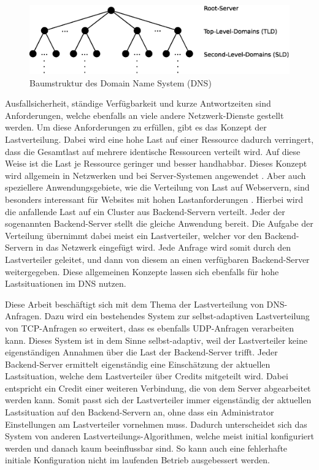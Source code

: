 \documentclass[a4paper, 12pt, BCOR10mm, DIV12, toc=bibliography, toc=listof, german]{scrbook}
\def \dns {Domain Name System (DNS)}
\begin{document}
		\begin{figure}
			\centering
			\includegraphics[width=\textwidth]{images/tree}
			\caption{Baumstruktur des \dns{}}
			\label{fig:tree}
		\end{figure}


		Ausfallsicherheit, ständige Verfügbarkeit und kurze Antwortzeiten sind Anforderungen, welche
		ebenfalls an viele andere Netzwerk-Dienste gestellt werden. Um diese Anforderungen zu erfüllen,
		gibt es das Konzept der Lastverteilung. Dabei wird eine hohe Last auf einer Ressource dadurch
		verringert, dass die Gesamtlast auf mehrere identische Ressourcen verteilt wird. Auf diese Weise
		ist die Last je Ressource geringer und besser handhabbar. Dieses Konzept wird allgemein in
		Netzwerken und bei Server-Systemen angewendet \cite{bourke2001, kopparapu2002}. Aber auch
		speziellere Anwendungsgebiete, wie die Verteilung von Last auf Webservern, sind besonders
		interessant für Websites mit hohen Lastanforderungen \cite{meplho2012}. Hierbei wird die
		anfallende Last auf ein Cluster aus Backend-Servern verteilt. Jeder der sogenannten
		Backend-Server stellt die gleiche Anwendung bereit. Die Aufgabe der Verteilung übernimmt dabei
		meist ein Lastverteiler, welcher vor den Backend-Servern in das Netzwerk eingefügt wird. Jede
		Anfrage wird somit durch den Lastverteiler geleitet, und dann von diesem an einen verfügbaren
		Backend-Server weitergegeben. Diese allgemeinen Konzepte lassen sich ebenfalls für hohe
		Lastsituationen im DNS nutzen.

		Diese Arbeit beschäftigt sich mit dem Thema der Lastverteilung von DNS-Anfragen. Dazu wird ein
		bestehendes System \cite{zinke2007,scsczile2008,zinke2012,salbnet} zur selbst-adaptiven
		Lastverteilung von TCP-Anfragen so erweitert, dass es ebenfalls UDP-Anfragen verarbeiten kann.
		Dieses System ist in dem Sinne selbst-adaptiv, weil der Lastverteiler keine eigenständigen
		Annahmen über die Last der Backend-Server trifft. Jeder Backend-Server ermittelt eigenständig
		eine Einschätzung der aktuellen Lastsituation, welche dem Lastverteiler über Credits
		mitgeteilt wird. Dabei entspricht ein Credit einer weiteren Verbindung, die von dem Server
		abgearbeitet werden kann. Somit passt sich der Lastverteiler immer eigenständig der aktuellen
		Lastsituation auf den Backend-Servern an, ohne dass ein Administrator Einstellungen am
		Lastverteiler vornehmen muss.  Dadurch unterscheidet sich das System von anderen
		Lastverteilungs-Algorithmen, welche meist initial konfiguriert werden und danach kaum
		beeinflussbar sind. So kann auch eine fehlerhafte initiale Konfiguration nicht im laufenden
		Betrieb ausgebessert werden.
\end{document}
